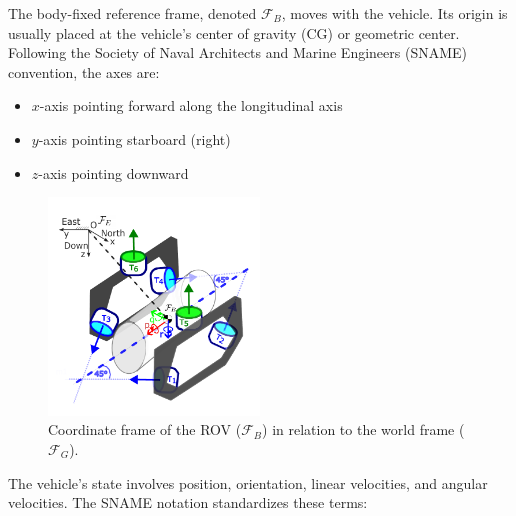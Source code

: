 The body-fixed reference frame, denoted $\mathcal{F}_B$, moves with the vehicle. Its origin is usually placed at the vehicle's center of gravity (CG) or geometric center. Following the Society of Naval Architects and Marine Engineers (SNAME) convention, the axes are:
\begin{itemize}
    \item $x$-axis pointing forward along the longitudinal axis
    \item $y$-axis pointing starboard (right)
    \item $z$-axis pointing downward
\end{itemize}

\begin{figure}[h!] %
    \centering
    \includegraphics[width=0.5\textwidth]{Phd_thesis/chapters/1.Introduction/figures/brov4.pdf} %
    \caption{Coordinate frame of the ROV ($\mathcal{F}_B$) in relation to the world frame ($\mathcal{F}_G$).}
    \label{fig:rov-coord-frame}
\end{figure}

The vehicle's state involves position, orientation, linear velocities, and angular velocities. The SNAME notation standardizes these terms:


